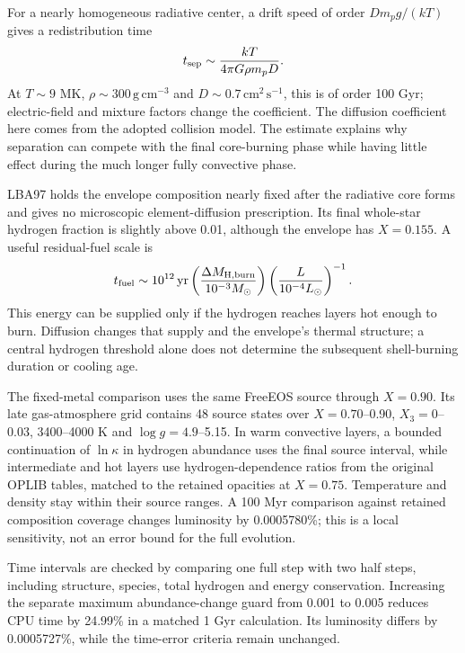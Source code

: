 \documentclass[11pt,letterpaper]{article}
\newcommand{\Ms}{M_\odot}\newcommand{\Rs}{R_\odot}\newcommand{\Ls}{L_\odot}
\begin{document}
For a nearly homogeneous radiative center, a drift speed of order
$D m_p g/(kT)$ gives a redistribution time
\begin{equation}
 t_{\rm sep}\sim\frac{kT}{4\pi G\rho m_pD}.
\end{equation}
At $T\sim9$ MK, $\rho\sim300\,\mathrm{g\,cm^{-3}}$ and
$D\sim0.7\,\mathrm{cm^2\,s^{-1}}$, this is of order 100 Gyr; electric-field
and mixture factors change the coefficient. The diffusion coefficient here
comes from the adopted collision model. The estimate explains why separation
can compete with the final core-burning phase while having little effect
during the much longer fully convective phase.

LBA97 holds the envelope composition nearly fixed after the radiative core
forms and gives no microscopic element-diffusion prescription. Its final
whole-star hydrogen fraction is slightly above 0.01, although the envelope
has $X=0.155$. A useful residual-fuel scale is
\begin{equation}
 t_{\rm fuel}\sim10^{12}\,\mathrm{yr}
 \left(\frac{\Delta M_{\rm H,burn}}{10^{-3}\Ms}\right)
 \left(\frac{L}{10^{-4}\Ls}\right)^{-1}.
\end{equation}
This energy can be supplied only if the hydrogen reaches layers hot enough
to burn. Diffusion changes that supply and the envelope's thermal structure;
a central hydrogen threshold alone does not determine the subsequent
shell-burning duration or cooling age.

The fixed-metal comparison uses the same FreeEOS source through
$X=0.90$. Its late gas-atmosphere grid contains 48 source states
over $X=0.70$--0.90, $X_3=0$--0.03, 3400--4000 K and
$\log g=4.9$--5.15. In warm convective layers, a bounded continuation of $\ln\kappa$
in hydrogen abundance uses the final source interval, while intermediate
and hot layers use hydrogen-dependence ratios from the original OPLIB tables,
matched to the retained opacities at $X=0.75$. Temperature and density stay
within their source ranges. A 100 Myr comparison against retained composition
coverage changes luminosity by 0.0005780\%; this is a local sensitivity,
not an error bound for the full evolution.

Time intervals are checked by comparing one full step with two half steps,
including structure, species, total hydrogen and energy conservation.
Increasing the separate maximum abundance-change guard from 0.001 to 0.005
reduces CPU time by 24.99\% in a matched 1 Gyr calculation. Its luminosity
differs by 0.0005727\%, while the time-error criteria remain unchanged.
\end{document}
